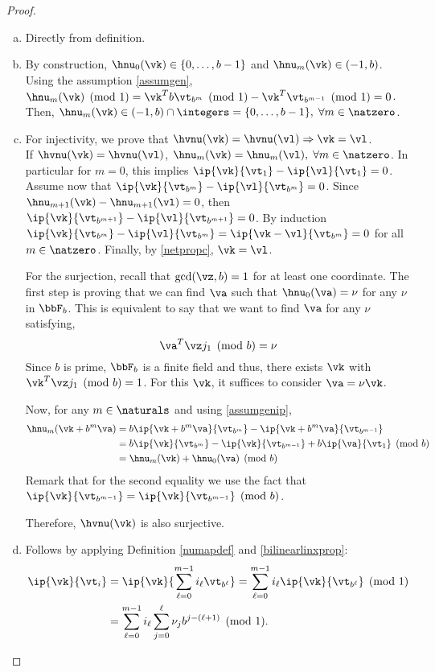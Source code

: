 \documentclass[]{elsarticle}
\theoremstyle{definition}
\begin{document}
\begin{proof}
\begin{enumerate}[a)]
\item Directly from definition.
\item By construction, $\hnu_0(\vk)\in\{0,\dots,b-1\}$ and $\hnu_m(\vk)\in (-1,b)$. Using the assumption \eqref{assumgen}, $\hnu_m(\vk)\pmod 1=\vk^Tb\vt_{b^m}\pmod 1-\vk^T\vt_{b^{m-1}}\pmod 1=0$. Then, $\hnu_m(\vk)\in (-1,b)\cap\integers=\{0,\dots,b-1\},\;\forall m\in\natzero$.

\item For injectivity, we prove that $\hvnu(\vk)=\hvnu(\vl) \Rightarrow \vk = \vl$.\\ If $\hvnu(\vk)=\hvnu(\vl)$, $\hnu_m(\vk)=\hnu_m(\vl),\;\forall m\in\natzero$. In particular for $m=0$, this implies $\ip{\vk}{\vt_1}-\ip{\vl}{\vt_1}=0$. Assume now that $\ip{\vk}{\vt_{b^m}}-\ip{\vl}{\vt_{b^m}}=0$. Since $\hnu_{m+1}(\vk)-\hnu_{m+1}(\vl)=0$, then $\ip{\vk}{\vt_{b^{m+1}}}-\ip{\vl}{\vt_{b^{m+1}}}=0$. By induction $\ip{\vk}{\vt_{b^{m}}}-\ip{\vl}{\vt_{b^{m}}}=\ip{\vk-\vl}{\vt_{b^{m}}}=0$ for all $m\in\natzero$. Finally, by \eqref{netpropc}, $\vk=\vl$.

    For the surjection, recall that $\gcd(\vz,b)=1$ for at least one coordinate. The first step is proving that we can find $\va$ such that $\hnu_0(\va)=\nu$ for any $\nu$ in $\bbF_b$. This is equivalent to say that we want to find $\va$ for any $\nu$ satisfying,
\[
\va^T\vz j_1\pmod b=\nu
\]
    Since $b$ is prime, $\bbF_b$ is a finite field and thus, there exists $\vk$ with $\vk^T\vz j_1 \pmod b=1$. For this $\vk$, it suffices to consider $\va=\nu\vk$.

    Now, for any $m\in\naturals$ and using \eqref{assumgenip},
\begin{align*}
\hnu_m(\vk+b^m\va)&=b\ip{\vk+b^m\va}{\vt_{b^m}}-\ip{\vk+b^m\va}{\vt_{b^{m-1}}}\\
&=b\ip{\vk}{\vt_{b^m}}-\ip{\vk}{\vt_{b^{m-1}}}+b\ip{\va}{\vt_{1}} \pmod b \\
&=\hnu_m(\vk)+\hnu_0(\va) \pmod b
\end{align*}
Remark that for the second equality we use the fact that $\ip{\vk}{\vt_{b^{m-1}}}=\ip{\vk}{\vt_{b^{m-1}}}\pmod b$.
    
    Therefore, $\hvnu(\vk)$ is also surjective.

\item Follows by applying  Definition \ref{numapdef} and \eqref{bilinearlinxprop}:
\begin{align*}
\ip{\vk}{\vt_i} &= \ip{\vk}{\sum_{\ell=0}^{m-1} i_\ell \vt_{b^{\ell}}} = \sum_{\ell=0}^{m-1} i_\ell \ip{\vk}{\vt_{b^{\ell}}} \pmod 1 \\
& = \sum_{\ell=0}^{m-1} i_\ell \sum_{j=0}^{\ell} \nu_jb^{j-(\ell+1)} \pmod 1.
\end{align*}

\end{enumerate}
\end{proof}
\end{document}
